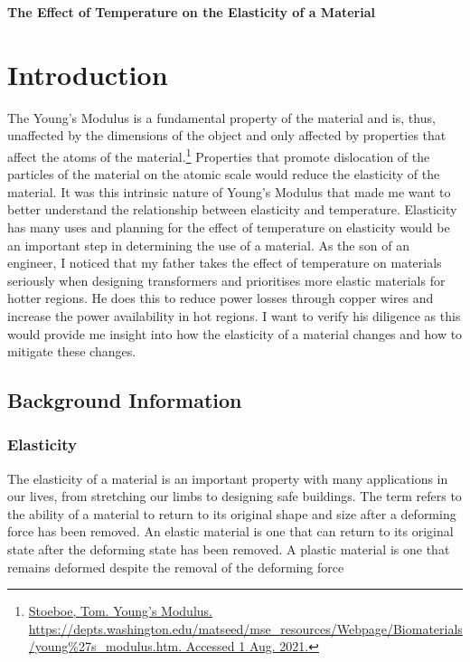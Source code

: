 \documentclass{article}
\begin{document}
\begin{center}
    \par{\huge \textbf{The Effect of Temperature on the Elasticity of a Material}}
\end{center}


\section{Introduction}


\par{The Young's Modulus is a fundamental property of the material and is, thus, unaffected by the dimensions of the object and only affected by properties that affect the atoms of the material.\footnote{\RaggedRight \url{Stoeboe, Tom. Young’s Modulus. https://depts.washington.edu/matseed/mse_resources/Webpage/Biomaterials/young\%27s_modulus.htm. Accessed 1 Aug. 2021.}}
 Properties that promote dislocation of the particles of the material on the atomic scale would reduce the elasticity of the material. It was this intrinsic nature of Young's Modulus that made me want to better understand the relationship between elasticity and temperature. Elasticity has many uses and planning for the effect of temperature on elasticity would be an important step in determining the use of a material. As the son of an engineer, I noticed that my father takes the effect of temperature on materials seriously when designing transformers and prioritises more elastic materials for hotter regions. He does this to reduce power losses through copper wires and increase the power availability in hot regions. I want to verify his diligence as this would provide me insight into how the elasticity of a material changes and how to mitigate these changes.}

\subsection{Background Information}

\subsubsection{Elasticity}

\par{The elasticity of a material is an important property with many applications in our lives, from stretching our limbs to designing safe buildings. The term refers to the ability of a material to return to its original shape and size after a deforming force has been removed\footnotemark. An elastic material is one that can return to its original state after the deforming state has been removed. A plastic material is one that remains deformed despite the removal of the deforming force \newline}
\end{document}
